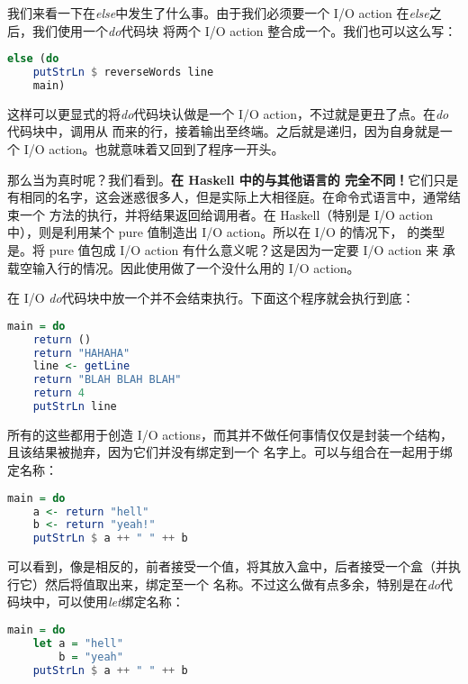 \documentclass[./main.tex]{subfiles}
\begin{document}
我们来看一下在\textit{else}中发生了什么事。由于我们必须要一个 I/O action 在\textit{else}之后，我们使用一个\textit{do}代码块
将两个 I/O action 整合成一个。我们也可以这么写：

\begin{lstlisting}[language=Haskell]
  else (do
    putStrLn $ reverseWords line
    main)
\end{lstlisting}

这样可以更显式的将\textit{do}代码块认做是一个 I/O action，不过就是更丑了点。在\textit{do}代码块中，调用从
而来的行，接着输出至终端。之后就是递归，因为自身就是一个 I/O action。也就意味着又回到了程序一开头。

那么当为真时呢？我们看到。\textbf{在 Haskell 中的与其他语言的
  完全不同！}它们只是有相同的名字，这会迷惑很多人，但是实际上大相径庭。在命令式语言中，通常结束一个
方法的执行，并将结果返回给调用者。在 Haskell（特别是 I/O action 中），则是利用某个 pure 值制造出 I/O action。所以在 I/O 的情况下，
的类型是。将 pure 值包成 I/O action 有什么意义呢？这是因为一定要 I/O action 来
承载空输入行的情况。因此使用做了一个没什么用的 I/O action。

在 I/O \textit{do}代码块中放一个并不会结束执行。下面这个程序就会执行到底：

\begin{lstlisting}[language=Haskell]
  main = do
    return ()
    return "HAHAHA"
    line <- getLine
    return "BLAH BLAH BLAH"
    return 4
    putStrLn line
\end{lstlisting}

所有的这些都用于创造 I/O actions，而其并不做任何事情仅仅是封装一个结构，且该结果被抛弃，因为它们并没有绑定到一个
名字上。可以与\acode{<-}组合在一起用于绑定名称：

\begin{lstlisting}[language=Haskell]
  main = do
    a <- return "hell"
    b <- return "yeah!"
    putStrLn $ a ++ " " ++ b
\end{lstlisting}

可以看到，像是相反的\acode{<-}，前者接受一个值，将其放入盒中，后者接受一个盒（并执行它）然后将值取出来，绑定至一个
名称。不过这么做有点多余，特别是在\textit{do}代码块中，可以使用\textit{let}绑定名称：

\begin{lstlisting}[language=Haskell]
  main = do
    let a = "hell"
        b = "yeah"
    putStrLn $ a ++ " " ++ b
\end{lstlisting}
\end{document}
